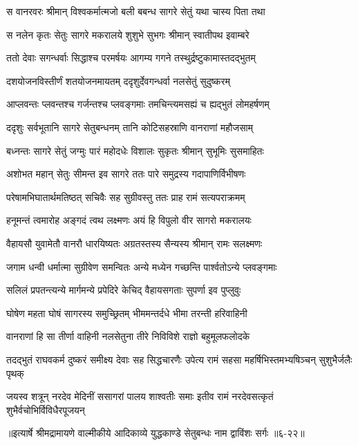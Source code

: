 \twolineshloka
{स वानरवरः श्रीमान् विश्वकर्मात्मजो बली}
{बबन्ध सागरे सेतुं यथा चास्य पिता तथा} %

\twolineshloka
{स नलेन कृतः सेतुः सागरे मकरालये}
{शुशुभे सुभगः श्रीमान् स्वातीपथ इवाम्बरे} %

\twolineshloka
{ततो देवाः सगन्धर्वाः सिद्धाश्च परमर्षयः}
{आगम्य गगने तस्थुर्द्रष्टुकामास्तदद्भुतम्} %

\twolineshloka
{दशयोजनविस्तीर्णं शतयोजनमायतम्}
{ददृशुर्देवगन्धर्वा नलसेतुं सुदुष्करम्} %

\twolineshloka
{आप्लवन्तः प्लवन्तश्च गर्जन्तश्च प्लवङ्गमाः}
{तमचिन्त्यमसह्यं च ह्यद्भुतं लोमहर्षणम्} %

\twolineshloka
{ददृशुः सर्वभूतानि सागरे सेतुबन्धनम्}
{तानि कोटिसहस्राणि वानराणां महौजसाम्} %

\twolineshloka
{बध्नन्तः सागरे सेतुं जग्मुः पारं महोदधेः}
{विशालः सुकृतः श्रीमान् सुभूमिः सुसमाहितः} %

\twolineshloka
{अशोभत महान् सेतुः सीमन्त इव सागरे}
{ततः पारे समुद्रस्य गदापाणिर्विभीषणः} %

\twolineshloka
{परेषामभिघातार्थमतिष्ठत् सचिवैः सह}
{सुग्रीवस्तु ततः प्राह रामं सत्यपराक्रमम्} %

\twolineshloka
{हनूमन्तं त्वमारोह अङ्गदं त्वथ लक्ष्मणः}
{अयं हि विपुलो वीर सागरो मकरालयः} %

\twolineshloka
{वैहायसौ युवामेतौ वानरौ धारयिष्यतः}
{अग्रतस्तस्य सैन्यस्य श्रीमान् रामः सलक्ष्मणः} %

\twolineshloka
{जगाम धन्वी धर्मात्मा सुग्रीवेण समन्वितः}
{अन्ये मध्येन गच्छन्ति पार्श्वतोऽन्ये प्लवङ्गमाः} %

\twolineshloka
{सलिलं प्रपतन्त्यन्ये मार्गमन्ये प्रपेदिरे}
{केचिद् वैहायसगताः सुपर्णा इव पुप्लुवुः} %

\twolineshloka
{घोषेण महता घोषं सागरस्य समुच्छ्रितम्}
{भीममन्तर्दधे भीमा तरन्ती हरिवाहिनी} %

\twolineshloka
{वानराणां हि सा तीर्णा वाहिनी नलसेतुना}
{तीरे निविविशे राज्ञो बहुमूलफलोदके} %

\twolineshloka
{तदद्भुतं राघवकर्म दुष्करं समीक्ष्य देवाः सह सिद्धचारणैः}
{उपेत्य रामं सहसा महर्षिभिस्तमभ्यषिञ्चन् सुशुभैर्जलैः पृथक्} %

\twolineshloka
{जयस्व शत्रून् नरदेव मेदिनीं ससागरां पालय शाश्वतीः समाः}
{इतीव रामं नरदेवसत्कृतं शुभैर्वचोभिर्विविधैरपूजयन्} %


॥इत्यार्षे श्रीमद्रामायणे वाल्मीकीये आदिकाव्ये युद्धकाण्डे सेतुबन्धः नाम द्वाविंशः सर्गः ॥६-२२॥
